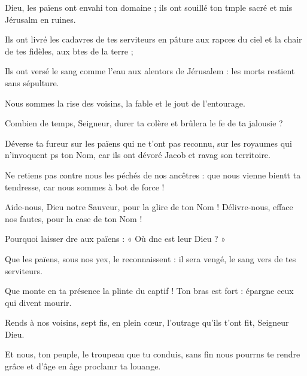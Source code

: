 \item Dieu, les païens ont envahi ton domaine ; ils ont souillé ton tmple sacré et mis Jérusalm en ruines.
\item Ils ont livré les cadavres de tes serviteurs en pâture aux rapces du ciel et la chair de tes fidèles, aux btes de la terre ;
\item Ils ont versé le sang comme l’eau aux alentors de Jérusalem : les morts restient sans sépulture.
\item Nous sommes la rise des voisins, la fable et le jout de l’entourage.
\item Combien de temps, Seigneur, durer ta colère et brûlera le fe de ta jalousie ?
\item Déverse ta fureur sur les païens qui ne t’ont pas reconnu, sur les royaumes qui n’invoquent ps ton Nom, car ils ont dévoré Jacob et ravag son territoire.
\item Ne retiens pas contre nous les péchés de nos ancêtres : que nous vienne bientt ta tendresse, car nous sommes à bot de force !
\item Aide-nous, Dieu notre Sauveur, pour la glire de ton Nom ! Délivre-nous, efface nos fautes, pour la case de ton Nom !
\item Pourquoi laisser dre aux païens : « Où dnc est leur Dieu ? » 
\item Que les païens, sous nos yex, le reconnaissent : il sera vengé, le sang vers de tes serviteurs.
\item Que monte en ta présence la plinte du captif ! Ton bras est fort : épargne ceux qui divent mourir.
\item Rends à nos voisins, sept fis, en plein cœur, l’outrage qu’ils t’ont fit, Seigneur Dieu.
\item Et nous, ton peuple, le troupeau que tu conduis, sans fin nous pourrns te rendre grâce et d’âge en âge proclamr ta louange.